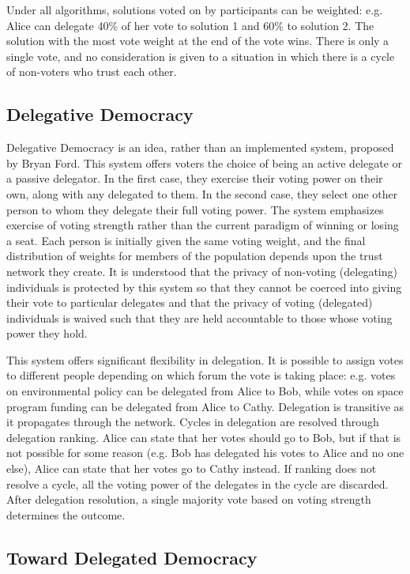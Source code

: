 \documentclass[a4paper]{acm_proc_article-sp}
\begin{document}
Under all algorithms, solutions voted on by participants can be weighted: e.g. Alice can delegate 40\% of her vote to
solution 1 and 60\% to solution 2.  The solution with the most vote weight at the end of the vote wins.  There is
only a single vote, and no consideration is given to a situation in which there is a cycle of non-voters who trust each other.

\subsection{Delegative Democracy}

Delegative Democracy is an idea, rather than an implemented system, proposed by Bryan Ford.  This system offers voters the
choice of being an active delegate or a passive delegator.  In the first case, they exercise their voting power on their own,
along with any delegated to them.  In the second case, they select one other person to whom they delegate their full voting power.
The system emphasizes exercise of voting strength rather than the current paradigm of winning or losing a seat.  Each person is
initially given the same voting weight, and the final distribution of weights for members of the population depends upon the
trust network they create.  It is understood that the privacy of non-voting (delegating) individuals is protected by this
system so that they cannot be coerced into giving their vote to particular delegates and that the privacy of voting (delegated)
individuals is waived such that they are held accountable to those whose voting power they hold.

This system offers significant flexibility in delegation.  It is possible to assign votes to different people depending on
which forum the vote is taking place: e.g. votes on environmental policy can be delegated from Alice to Bob, while votes on
space program funding can be delegated from Alice to Cathy.  Delegation is transitive as it propagates through the network.
Cycles in delegation are resolved through delegation ranking.  Alice can state that her votes should go to Bob, but if that is
not possible for some reason (e.g. Bob has delegated his votes to Alice and no one else), Alice can state that her votes go to
Cathy instead.  If ranking does not resolve a cycle, all the voting power of the delegates in the cycle are discarded.  After
delegation resolution, a single majority vote based on voting strength determines the outcome.

\subsection{Toward Delegated Democracy}
\end{document}
